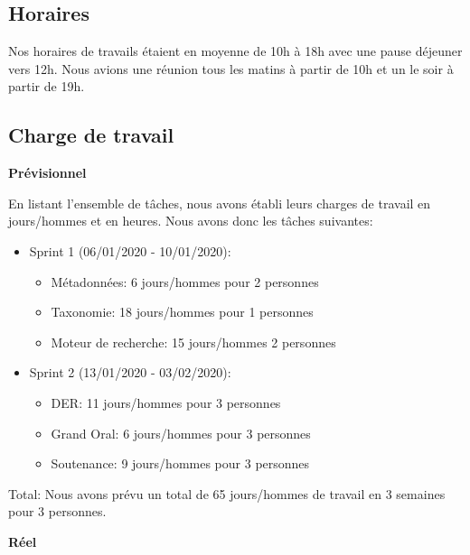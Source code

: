 \subsection{Horaires}
Nos horaires de travails étaient en moyenne de 10h à 18h avec une pause déjeuner vers 12h.
Nous avions une réunion tous les matins à partir de 10h et un le soir à partir de 19h.



\subsection{Charge de travail}

\textbf{Prévisionnel} 

En listant l'ensemble de tâches, nous avons établi leurs charges de travail en jours/hommes et en heures. 
Nous avons donc les tâches suivantes: 

\begin{itemize}
    \item Sprint 1 (06/01/2020 - 10/01/2020):
        \begin{itemize}
            \item Métadonnées: 6 jours/hommes pour 2 personnes
            \item Taxonomie: 18 jours/hommes pour 1 personnes
            \item Moteur de recherche: 15 jours/hommes 2 personnes
        \end{itemize}
    \item Sprint 2 (13/01/2020 - 03/02/2020):
    \begin{itemize}
        \item DER\@: 11 jours/hommes pour 3 personnes
        \item Grand Oral: 6 jours/hommes pour 3 personnes
        \item Soutenance:  9 jours/hommes pour 3 personnes
    \end{itemize}
\end{itemize} 

Total:  Nous avons prévu un total de 65 jours/hommes de travail en 3 semaines pour 3 personnes.


\textbf{Réel}

